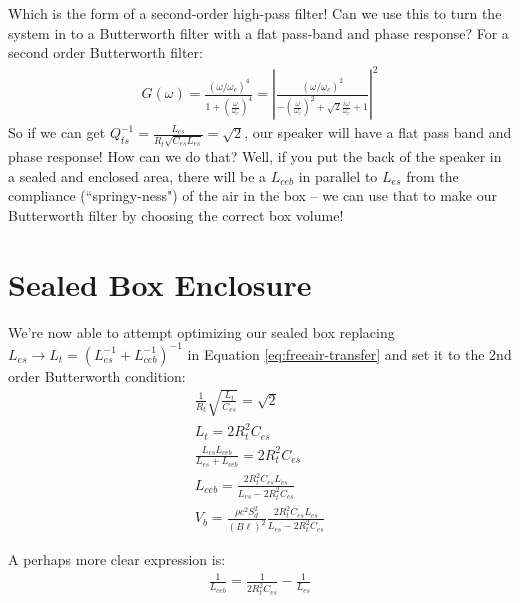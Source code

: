 \documentclass[10pt]{book}
\begin{document}
Which is the form of a second-order high-pass filter! Can we use this to turn the system in to a Butterworth filter with a flat pass-band and phase response? For a second order Butterworth filter:
\begin{align}
G(\omega)=\frac{(\omega/\omega_c)^4}{1+\left( \frac{\omega}{\omega_c} \right)^4}=\left| \frac{(\omega/\omega_c)^2}{-\left(\frac{\omega}{\omega_c} \right)^2 +\sqrt{2}\frac{i\omega}{\omega_c} +1} \right|^2
\end{align}
So if we can get $Q_{ts}^{-1}=\frac{ L_{es}}{R_{t}\sqrt{C_{es}L_{es}}} =\sqrt{2}$, our speaker will have a flat pass band and phase response! How can we do that? Well, if you put the back of the speaker in a sealed and enclosed area, there will be a $L_{ceb}$ in parallel to $L_{es}$ from the compliance (``springy-ness") of the air in the box -- we can use that to make our Butterworth filter by choosing the correct box volume!

\section{Sealed Box Enclosure} We're now able to attempt optimizing our sealed box replacing $L_{es}\rightarrow L_t=\left(L_{es}^{-1}+L_{ceb}^{-1}\right)^{-1}$ in Equation \ref{eq:freeair-transfer} and set it to the 2nd order Butterworth condition:
\begin{align}
\frac{ 1}{R_{t}}\sqrt{\frac{L_t}{C_{es}} } =\sqrt{2}\\
L_t=2R_{t}^2C_{es}\\
\frac{L_{es}L_{ceb}}{L_{es}+L_{ceb}}=2R_{t}^2C_{es}\\
L_{ceb}=\frac{2R_{t}^2C_{es}L_{es}}{L_{es}-2R_{t}^2C_{es}}\\
V_b=\frac{\rho c^2 S_d^2}{(B\ell)^2}\frac{2R_{t}^2C_{es}L_{es}}{L_{es}-2R_{t}^2C_{es}}
\end{align}

A perhaps more clear expression is:
\begin{align}
\frac{1}{L_{ceb}}=\frac{1}{2R_{t}^2C_{es}}-\frac{1}{L_{es}}
\end{align}
\end{document}
